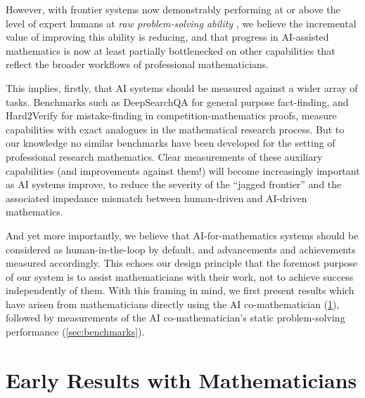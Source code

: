 \documentclass[11pt, a4paper, copyright, gdm]{google}
\begin{document}
However, with frontier systems now demonstrably performing at or above the level of expert humans at \textit{raw problem-solving ability} \citep[e.g.,][]{luong2025advanced, abouzaid2026proof}, we believe the incremental value of improving this ability is reducing, and that progress in AI-assisted mathematics is now at least partially bottlenecked on other capabilities that reflect the broader workflows of professional mathematicians.

This implies, firstly, that AI systems should be measured against a wider array of tasks. 
Benchmarks such as DeepSearchQA \citep{gupta2026} for general purpose fact-finding, and Hard2Verify \citep{pandit2025} for mistake-finding in competition-mathematics proofs, measure capabilities with exact analogues in the mathematical research process.
But to our knowledge no similar benchmarks have been developed for the setting of professional research mathematics.
Clear measurements of these auxiliary capabilities (and improvements against them!) will become increasingly important as AI systems improve, to reduce the severity of the ``jagged frontier'' \citep{dellacqua2026navigating} and the associated impedance mismatch between human-driven and AI-driven mathematics.

And yet more importantly, we believe that AI-for-mathematics systems should be considered as human-in-the-loop by default, and advancements and achievements measured accordingly.
This echoes our design principle that the foremost purpose of our system is to assist mathematicians with their work, not to achieve success independently of them.
With this framing in mind, we first present results which have arisen from mathematicians directly using the AI co-mathematician (\cref{sec:early_results}), followed by measurements of the AI co-mathematician's static problem-solving performance (\cref{sec:benchmarks}).

\section{Early Results with Mathematicians}
\label{sec:early_results}
\end{document}
